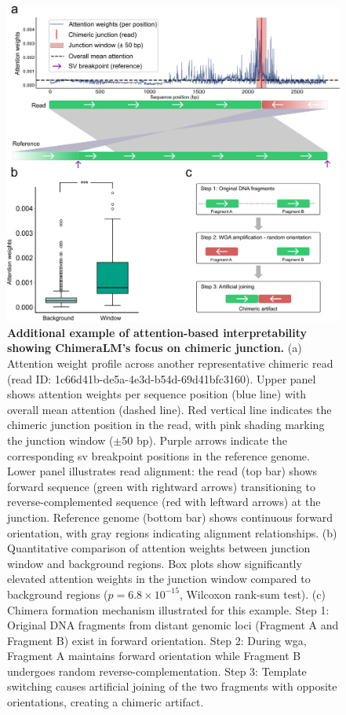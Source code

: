 \documentclass[pdflatex,sn-nature]{sn-jnl}%
\theoremstyle{thmstyleone}%
\theoremstyle{thmstyletwo}%
\theoremstyle{thmstylethree}%
\begin{document}
\begin{figure}[!ht]
	\begin{center}
		\includegraphics[width=\textwidth]{final_figures/sf3}
	\end{center}
	\caption{{\bf Additional example of attention-based interpretability showing ChimeraLM's focus on chimeric junction.}
		(a) Attention weight profile across another representative chimeric read (read ID: 1c66d41b-de5a-4e3d-b54d-69d41bfc3160). Upper panel shows attention weights per sequence position (blue line) with overall mean attention (dashed line). Red vertical line indicates the chimeric junction position in the read, with pink shading marking the junction window ($\pm$50 bp). Purple arrows indicate the corresponding \gls{sv} breakpoint positions in the reference genome. Lower panel illustrates read alignment: the read (top bar) shows forward sequence (green with rightward arrows) transitioning to reverse-complemented sequence (red with leftward arrows) at the junction. Reference genome (bottom bar) shows continuous forward orientation, with gray regions indicating alignment relationships.
		(b) Quantitative comparison of attention weights between junction window and background regions. Box plots show significantly elevated attention weights in the junction window compared to background regions ($p = 6.8 \times 10^{-15}$, Wilcoxon rank-sum test).
		(c) Chimera formation mechanism illustrated for this example. Step 1: Original DNA fragments from distant genomic loci (Fragment A and Fragment B) exist in forward orientation. Step 2: During \gls{wga}, Fragment A maintains forward orientation while Fragment B undergoes random reverse-complementation. Step 3: Template switching causes artificial joining of the two fragments with opposite orientations, creating a chimeric artifact.}\label{fig:sf3}
\end{figure}
\end{document}
